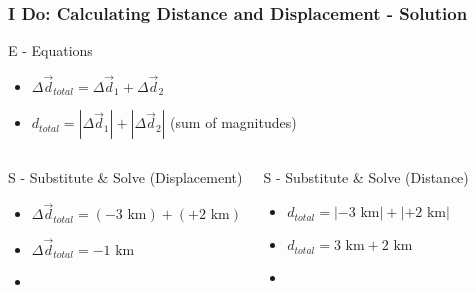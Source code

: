 \documentclass{beamer}
\begin{document}
\begin{frame}
\frametitle{I Do: Calculating Distance and Displacement - Solution}
\begin{block}{E - Equations}
\begin{itemize}
    \item $\Delta \vec{d}_{total} = \Delta \vec{d}_1 + \Delta \vec{d}_2$
    \item $d_{total} = |\Delta \vec{d}_1| + |\Delta \vec{d}_2|$ (sum of magnitudes)
\end{itemize}
\end{block}
\pause
\begin{columns}
\begin{block}{S - Substitute \& Solve (Displacement)}
\begin{itemize}
    \item $\Delta \vec{d}_{total} = (-3 \text{ km}) + (+2 \text{ km})$
    \item $\Delta \vec{d}_{total} = -1 \text{ km}$
    \item {}
\end{itemize}
\end{block}
\begin{block}{S - Substitute \& Solve (Distance)}
\begin{itemize}
    \item $d_{total} = |-3 \text{ km}| + |+2 \text{ km}|$
    \item $d_{total} = 3 \text{ km} + 2 \text{ km}$
    \item {}
\end{itemize}
\end{block}
\end{columns}
\end{frame}
\end{document}
